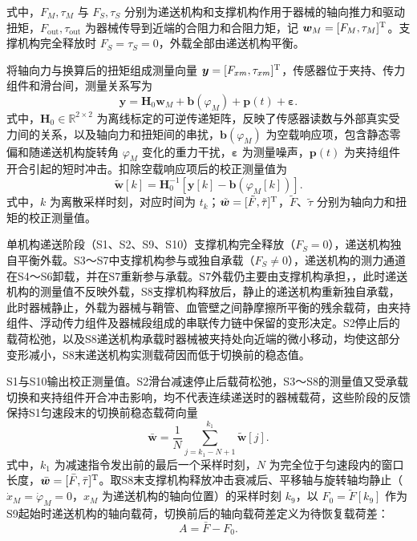 \documentclass{JQR_LaTeX_Template-0507/JQRnew}
\providecommand{\RevisionColor}{\color{black}}
\newcommand{\revbegin}{\begingroup\RevisionColor}
\begin{document}
式中，$F_M,\tau_M$ 与 $F_S,\tau_S$ 分别为递送机构和支撑机构作用于器械的轴向推力和驱动扭矩，$F_{\mathrm{out}},\tau_{\mathrm{out}}$ 为器械传导到近端的合阻力和合阻力矩，记 $\bm w_M=[F_M,\tau_M]^{\rm T}$。支撑机构完全释放时 $F_S=\tau_S=0$，外载全部由递送机构平衡。

\revbegin
将轴向力与换算后的扭矩组成测量向量 $\bm y=[F_{xm},\tau_{xm}]^{\rm T}$，传感器位于夹持、传力组件和滑台间，测量关系写为
\begin{equation}
\label{eq:measurement}
\bm y=\bm H_0\bm w_M+\bm b(\varphi_M)+\bm p(t)+\bm\varepsilon.
\end{equation}
式中，$\bm H_0\in\mathbb R^{2\times2}$ 为离线标定的可逆传递矩阵，反映了传感器读数与外部真实受力间的关系，以及轴向力和扭矩间的串扰，$\bm b(\varphi_M)$ 为空载响应项，包含静态零偏和随递送机构旋转角 $\varphi_M$ 变化的重力干扰，$\bm\varepsilon$ 为测量噪声，$\bm p(t)$ 为夹持组件开合引起的短时冲击。扣除空载响应项后的校正测量值为
\begin{equation}
\label{eq:corrected-measurement}
\tilde{\bm w}[k]=\bm H_0^{-1}\!\left[
\bm y[k]-\bm b(\varphi_M[k])\right].
\end{equation}
式中，$k$ 为离散采样时刻，对应时间为 $t_k$；$\tilde{\bm w}=[\tilde F,\tilde\tau]^{\rm T}$，$\tilde F$、$\tilde\tau$ 分别为轴向力和扭矩的校正测量值。

单机构递送阶段（S1、S2、S9、S10）支撑机构完全释放（$F_S=0$），递送机构独自平衡外载。S3～S7中支撑机构参与或独自承载（$F_S\neq0$），递送机构的测力通道在S4～S6卸载，并在S7重新参与承载。S7外载仍主要由支撑机构承担，，此时递送机构的测量值不反映外载，S8支撑机构释放后，静止的递送机构重新独自承载，此时器械静止，外载为器械与鞘管、血管壁之间静摩擦所平衡的残余载荷，由夹持组件、浮动传力组件及器械段组成的串联传力链中保留的变形决定。S2停止后的载荷松弛，以及S8递送机构承载时器械被夹持处向近端的微小移动，均使这部分变形减小，S8末递送机构实测载荷因而低于切换前的稳态值。

S1与S10输出校正测量值。S2滑台减速停止后载荷松弛，S3～S8的测量值又受承载切换和夹持组件开合冲击影响，均不代表连续递送时的器械载荷，这些阶段的反馈保持S1匀速段末的切换前稳态载荷向量
\begin{equation}
	\label{eq:lock}
	\bar{\bm w}=\frac{1}{N}
\sum_{j=k_1-N+1}^{k_1}
\tilde{\bm w}[j].
\end{equation}
式中，$k_1$ 为减速指令发出前的最后一个采样时刻，$N$ 为完全位于匀速段内的窗口长度，$\bar{\bm w}=[\bar F,\bar\tau]^{\rm T}$。取S8末支撑机构释放冲击衰减后、平移轴与旋转轴均静止（$\dot x_M=\dot\varphi_M=0$，$x_M$ 为递送机构的轴向位置）的采样时刻 $k_9$，以 $F_0=\tilde F[k_9]$ 作为S9起始时递送机构的轴向载荷，切换前后的轴向载荷差定义为待恢复载荷差：
\begin{equation}
	\label{eq:deficit}
	A=\bar F-F_0.
\end{equation}
\end{document}
